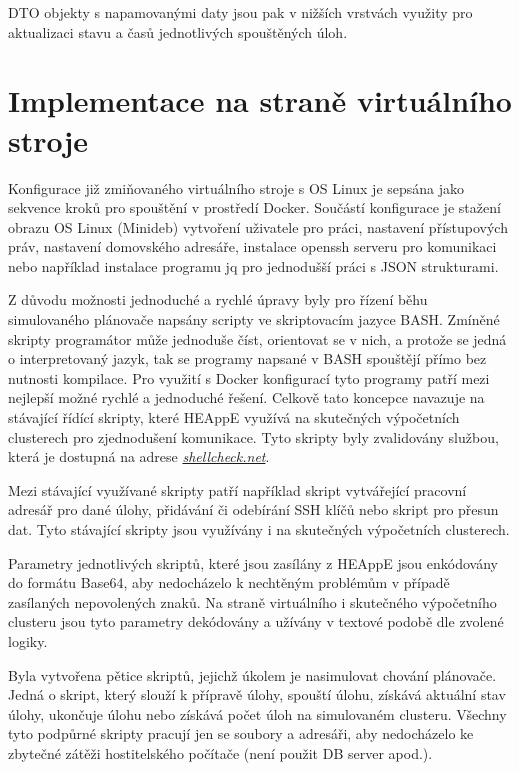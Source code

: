 DTO objekty s napamovanými daty jsou pak v nižších vrstvách využity pro aktualizaci stavu a časů jednotlivých spouštěných úloh.

\section{Implementace na straně virtuálního stroje}
Konfigurace již zmiňovaného virtuálního stroje s OS Linux je sepsána jako sekvence kroků pro spouštění v prostředí Docker. Součástí konfigurace je stažení obrazu OS Linux (Minideb) vytvoření uživatele pro práci, nastavení přístupových práv, nastavení domovského adresáře, instalace openssh serveru pro komunikaci nebo například instalace programu jq pro jednodušší práci s JSON strukturami.

Z důvodu možnosti jednoduché a rychlé úpravy byly pro řízení běhu simulovaného plánovače napsány scripty ve skriptovacím jazyce BASH. Zmíněné skripty programátor může jednoduše číst, orientovat se v nich, a protože se jedná o interpretovaný jazyk, tak se programy napsané v BASH spouštějí přímo bez nutnosti kompilace. Pro využití s Docker konfigurací tyto programy patří mezi nejlepší možné rychlé a jednoduché řešení. Celkově tato koncepce navazuje na stávající řídící skripty, které HEAppE využívá na skutečných výpočetních clusterech pro zjednodušení komunikace. Tyto skripty byly zvalidovány službou, která je dostupná na adrese \emph{\href{https://www.shellcheck.net/}{shellcheck.net}}.

Mezi stávající využívané skripty patří například skript vytvářející pracovní adresář pro dané úlohy, přidávání či odebírání SSH klíčů nebo skript pro přesun dat. Tyto stávající skripty jsou využívány i na skutečných výpočetních clusterech.

Parametry jednotlivých skriptů, které jsou zasílány z HEAppE jsou enkódovány do formátu Base64, aby nedocházelo k nechtěným problémům v případě zasílaných nepovolených znaků. Na straně virtuálního i skutečného výpočetního clusteru jsou tyto parametry dekódovány a užívány v textové podobě dle zvolené logiky.



\hfill \break


Byla vytvořena pětice skriptů, jejichž úkolem je nasimulovat chování plánovače. Jedná o skript, který slouží k přípravě úlohy, spouští úlohu, získává aktuální stav úlohy, ukončuje úlohu nebo získává počet úloh na simulovaném clusteru. Všechny tyto podpůrné skripty pracují jen se soubory a adresáři, aby nedocházelo ke zbytečné zátěži hostitelského počítače (není použit DB server apod.). 

